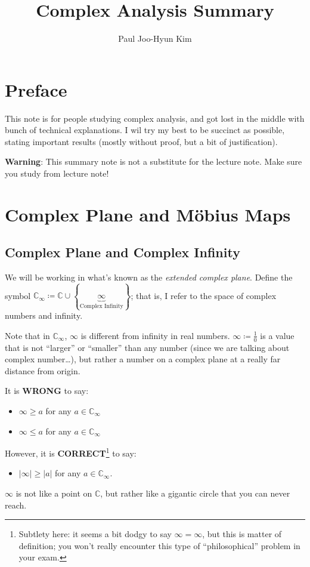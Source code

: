 \documentclass[a4paper, 12pt]{article}
\title{Complex Analysis Summary}
\author{Paul Joo-Hyun Kim}
\theoremstyle{definition}
\numberwithin{theorem}{section}
\numberwithin{definition}{section}
\numberwithin{exercise}{section}
\numberwithin{remark}{section}
\numberwithin{figure}{section}
\numberwithin{example}{section}
\newcommand{\C}{\mathbb{C}}
\begin{document}
\maketitle
\tableofcontents
\setcounter{section}{-1}
\section{Preface}
This note is for people studying complex analysis,
and got lost in the middle with bunch of technical explanations.
I wil try my best to be succinct as possible,
stating important results (mostly without proof, but a bit of justification).

\textbf{Warning}: This summary note is not a substitute for the lecture note.
Make sure you study from lecture note!

\section{Complex Plane and M\"obius Maps}
\subsection{Complex Plane and Complex Infinity}
We will be working in what's known as the \textit{extended complex plane}.
Define the symbol $\C_{\infty} \coloneqq \C \cup \left\{ \underbrace{\infty}_{\text{Complex Infinity}} \right\}$;
that is, I refer to the space of complex numbers
and infinity.

Note that in $\C_{\infty}$, $\infty$ is different from infinity in real numbers.
$\infty \coloneqq \frac{1}{0}$ is a value that is not ``larger'' or ``smaller'' than any number
(since we are talking about complex number\dots), but rather
a number on a complex plane at a really far distance from origin.

It is \textbf{WRONG} to say:
\begin{itemize}
    \item $\infty \geq a$ for any $a \in \C_{\infty}$
    \item $\infty \leq a$ for any $a \in \C_{\infty}$
\end{itemize}
However, it is \textbf{CORRECT}\footnote{
    Subtlety here: it seems a bit dodgy to say $\infty = \infty$,
    but this is matter of definition;
    you won't really encounter this type of ``philosophical'' problem
    in your exam.
} to say:
\begin{itemize}
    \item $|\infty| \geq |a|$ for any $a \in \C_{\infty}$.
\end{itemize}
$\infty$ is not like a point on $\C$, but rather like a gigantic circle that you can never reach.
\end{document}

